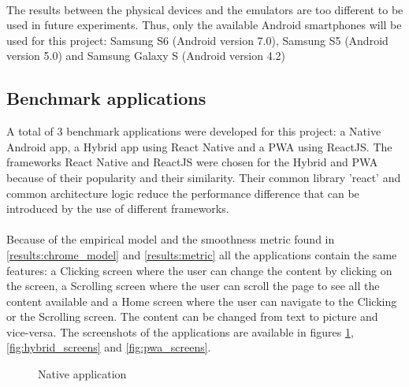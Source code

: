 \documentclass{kththesis}
\begin{document}
\paragraph{}
The results between the physical devices and the emulators are too different to be used in future experiments. Thus, only the available Android smartphones will be used for this project: Samsung S6 (Android version 7.0), Samsung S5 (Android version 5.0) and Samsung Galaxy S (Android version 4.2)


\subsection{Benchmark applications}

A total of 3 benchmark applications were developed for this project: a Native Android app, a Hybrid app using React Native and a PWA using ReactJS. The frameworks React Native and ReactJS were chosen for the Hybrid and PWA because of their popularity and their similarity. Their common library 'react' and common architecture logic reduce the performance difference that can be introduced by the use of different frameworks.

\paragraph{}
Because of the empirical model and the smoothness metric found in \autoref{results:chrome_model} and \autoref{results:metric} all the applications contain the same features: a Clicking screen where the user can change the content by clicking on the screen, a Scrolling screen where the user can scroll the page to see all the content available and a Home screen where the user can navigate to the Clicking or the Scrolling screen. The content can be changed from text to picture and vice-versa. The screenshots of the applications are available in figures \ref{fig:native_screens}, \ref{fig:hybrid_screens} and \ref{fig:pwa_screens}.

\begin{figure}
    \centering
    \hfill
    \hfill
    \hfill
    \hfill
    \caption{Native application}
    \label{fig:native_screens}
\end{figure}
\end{document}
